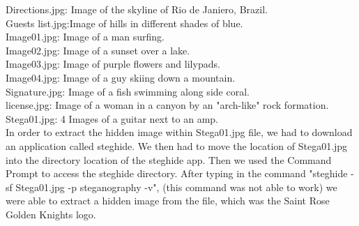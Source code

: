 \documentclass[12ptletterpaper]{paper}
\newcommand\tab[1][1cm]{\hspace*{#1}}
\begin{document}
\begin{flushleft}
		\tab Directions.jpg: Image of the skyline of Rio de Janiero, Brazil.\\
		\tab Guests list.jpg:Image of hills in different shades of blue.\\
		\tab Image01.jpg: Image of a man surfing.\\
		\tab Image02.jpg: Image of a sunset over a lake.\\
		\tab Image03.jpg: Image of purple flowers and lilypads.\\
		\tab Image04.jpg: Image of a guy skiing down a mountain.\\
		\tab Signature.jpg: Image of a fish swimming along side coral.\\
		\tab license.jpg: Image of a woman in a canyon by an "arch-like" rock formation.\\
		\tab Stega01.jpg: 4 Images of a guitar next to an amp.\\
		
		In order to extract the hidden image within Stega01.jpg file, we had to download an application called steghide. We then had to move the location of Stega01.jpg into the directory location of the steghide app. Then we used the Command Prompt to access the steghide directory. After typing in the command "steghide -sf Stega01.jpg -p steganography -v", (this command was not able to work) we were able to extract a hidden image from the file, which was the Saint Rose Golden Knights logo.\\
		
		
	\end{flushleft}	
\end{document}
